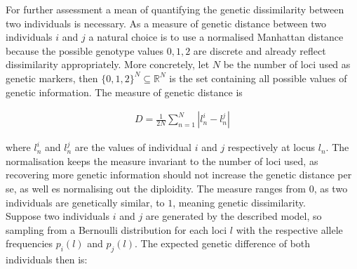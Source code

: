 \documentclass[a4paper, 11pt]{article}
\begin{document}
For further assessment a mean of quantifying the genetic dissimilarity between two individuals is necessary. As a measure of genetic distance between two individuals $i$ and $j$ a natural choice is to use a normalised Manhattan distance because the possible genotype values ${0, 1, 2}$ are discrete and already reflect dissimilarity appropriately. More concretely, let $N$ be the number of loci used as genetic markers, then $\{0,1,2\}^N \subseteq \mathbb{R}^N$  is the set containing all possible values of genetic information. The measure of genetic distance is 

\begin{align*}
D = \frac{1}{2N}\sum^{N}_{n = 1} |l^i_n - l^j_n|
\end{align*}

where $l^i_n$ and $l^j_n$ are the values of individual $i$ and $j$ respectively at locus $l_n$. The normalisation keeps the measure invariant to the number of loci used, as recovering more genetic information should not increase the genetic distance per se, as well es normalising out the diploidity. The measure ranges from $0$, as two individuals are genetically similar, to $1$, meaning genetic dissimilarity.
\\
Suppose two individuals $i$ and $j$ are generated by the described model, so sampling from a Bernoulli distribution for each loci $l$ with the respective allele frequencies $p_i(l)$ and $p_j(l)$. The expected genetic difference of both individuals then is:
 
\end{document}
